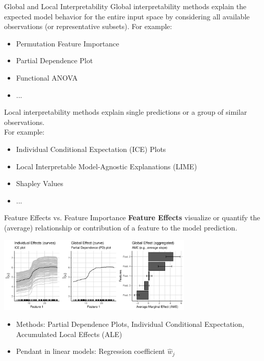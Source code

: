 \documentclass[aspectratio=169]{../latex_main/tntbeamer}  %
\begin{document}
\begin{frame}[c]{Global and Local Interpretability}
	Global interpretability methods explain the expected model behavior for the entire input space by considering all available observations (or representative subsets). For example:
	\begin{itemize}
		\item Permutation Feature Importance
		\item Partial Dependence Plot
		\item Functional ANOVA
		\item ...
	\end{itemize}
	\pause
	Local interpretability methods explain single predictions or a group of similar observations.\\ For example:
	\begin{itemize}
		\item Individual Conditional Expectation (ICE) Plots
		\item Local Interpretable Model-Agnostic Explanations (LIME)
		\item Shapley Values
		\item ...
	\end{itemize}
\end{frame}

\begin{frame}[c]{Feature Effects vs. Feature Importance}
	\vspace{-1em}
	\textbf{Feature Effects} visualize or quantify the (average) relationship or contribution of a feature to the model prediction.
	\begin{center}
		\includegraphics[page=1, width=0.7\textwidth]{figure/feature-effects}
	\end{center}
	\begin{itemize}
		\item Methods: Partial Dependence Plots, Individual Conditional Expectation,\\ Accumulated Local Effects (ALE)
		\item Pendant in linear models: Regression coefficient $\hat{w}_j$
	\end{itemize}
\end{frame}
\end{document}
